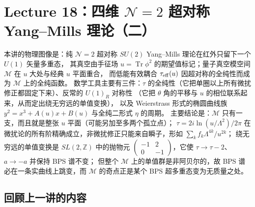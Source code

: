 \section{Lecture 18：四维 $\mathcal{N}=2$ 超对称 Yang--Mills 理论（二）}

\begin{keytakeaways}
本讲的物理图像是：纯 $\mathcal{N}=2$ 超对称 $SU(2)$ Yang--Mills 理论在红外只留下一个 $U(1)$ 矢量多重态，
其真空由手征场 $u=\operatorname{Tr}\phi^2$ 的期望值标记；量子真空模空间 $\mathcal{M}$ 在 $u$ 大处与经典 $u$ 平面重合，
而低能有效耦合 $\tau_{\rm eff}(u)$ 因超对称的全纯性而成为 $\mathcal{M}$ 上的全纯函数。
数学工具主要有三件：$\tau$ 的全纯性（它把单圈以上所有微扰修正都固定下来）、反常的 $U(1)_R$ 对称性
（它把 $\theta$ 角的平移与 $u$ 的相位联系起来，从而定出绕无穷远的单值变换），
以及 Weierstrass 形式的椭圆曲线族 $y^2=x^3+A(u)x+B(u)$ 与全纯二形式 $\eta$ 的周期。
主要结论是：$\mathcal{M}$ 只有一支，而且就是整张 $u$ 平面（可能另加至多两个孤立点）；
$\tau=2i\ln(u/\Lambda^2)/2\pi$ 在微扰论的所有阶精确成立，非微扰修正只能来自瞬子，形如 $\sum_k f_k\Lambda^{4k}/u^{2k}$；
绕无穷远的单值变换是 $SL(2,\mathbb{Z})$ 中的抛物元 $\begin{pmatrix}-1&2\\0&-1\end{pmatrix}$，它使 $\tau\to\tau-2$、$a\to-a$ 并保持 BPS 谱不变；
但整个 $\mathcal{M}$ 上的单值群是非阿贝尔的，故 BPS 谱必在一条实曲线上跳变，而 $\mathcal{M}$ 的奇点正是某个 BPS 超多重态变为无质量之处。
\end{keytakeaways}

\subsection{回顾上一讲的内容}

